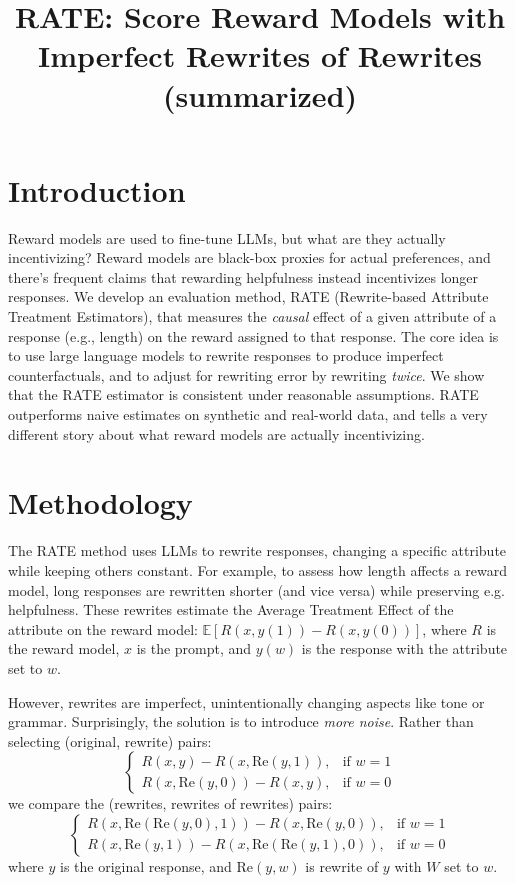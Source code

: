 \documentclass{article}
\title{RATE: Score Reward Models with Imperfect Rewrites of Rewrites (summarized)}
\begin{document}
\maketitle

\vspace{-2cm}
\section{Introduction}

Reward models are used to fine-tune LLMs, but what are they actually incentivizing? Reward models are black-box proxies for actual preferences, and there's frequent claims that rewarding helpfulness instead incentivizes longer responses. 
We develop an evaluation method, RATE (Rewrite-based Attribute Treatment Estimators), that measures the \emph{causal} effect of a given attribute of a response (e.g., length) on the reward assigned to that response.
The core idea is to use large language models to rewrite responses to produce imperfect counterfactuals, and to adjust for rewriting error by rewriting \emph{twice}. We show that the RATE estimator is consistent under reasonable assumptions. RATE outperforms naive estimates on synthetic and real-world data, and tells a very different story about what reward models are actually incentivizing.

\section{Methodology}

The RATE method uses LLMs to rewrite responses, changing a specific attribute while keeping others constant. For example, to assess how length affects a reward model, long responses are rewritten shorter (and vice versa) while preserving e.g. helpfulness. These rewrites estimate the Average Treatment Effect of the attribute on the reward model: $\mathbb{E}[R(x, y(1)) - R(x, y(0))]$, where $R$ is the reward model, $x$ is the prompt, and $y(w)$ is the response with the attribute set to $w$.

However, rewrites are imperfect, unintentionally changing aspects like tone or grammar. Surprisingly, the solution is to introduce \emph{more noise}. Rather than selecting (original, rewrite) pairs:
\[\begin{cases}
  R(x, y) - R(x, \text{Re}(y, 1)), & \text{if } w = 1 \\
  R(x, \text{Re}(y, 0)) - R(x, y), & \text{if } w = 0
\end{cases}\]
we compare the (rewrites, rewrites of rewrites) pairs:
\[\begin{cases}
  R(x, \text{Re}(\text{Re}(y, 0), 1)) - R(x, \text{Re}(y, 0)), & \text{if } w = 1 \\
  R(x, \text{Re}(y, 1)) - R(x, \text{Re}(\text{Re}(y, 1), 0)), & \text{if } w = 0
\end{cases}\]
where $y$ is the original response, and $\text{Re}(y, w)$ is rewrite of $y$ with $W$ set to $w$.
\end{document}
